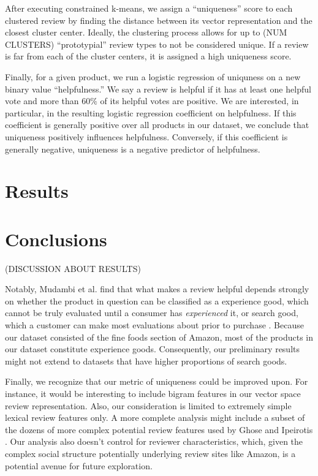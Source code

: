 \documentclass[10pt]{article}
\begin{document}
After executing constrained k-means, we assign a ``uniqueness'' score to each clustered review by finding the distance between its vector representation and the closest cluster center. Ideally, the clustering process allows for up to (NUM CLUSTERS) ``prototypial'' review types to not be considered unique. If a review is far from each of the cluster centers, it is assigned a high uniqueness score.

Finally, for a given product, we run a logistic regression of uniquness on a new binary value ``helpfulness.'' We say a review is helpful if it has at least one helpful vote and more than $60\%$ of its helpful votes are positive. We are interested, in particular, in the resulting logistic regression coefficient on helpfulness. If this coefficient is generally positive over all products in our dataset, we conclude that uniqueness positively influences helpfulness. Conversely, if this coefficient is generally negative, uniqueness is a negative predictor of helpfulness.
\section*{Results}



\section*{Conclusions}
(DISCUSSION ABOUT RESULTS)

Notably, Mudambi et al. find that what makes a review helpful depends strongly on whether the product in question can be classified as a experience good, which cannot be truly evaluated until a consumer has \emph{experienced} it, or search good, which a customer can make most evaluations about prior to purchase \cite{mudambi2010makes}. Because our dataset consisted of the fine foods section of Amazon, most of the products in our dataset constitute experience goods. Consequently, our preliminary results might not extend to datasets that have higher proportions of search goods.

Finally, we recognize that our metric of uniqueness could be improved upon. For instance, it would be interesting to include bigram features in our vector space review representation. Also, our consideration is limited to extremely simple lexical review features only. A more complete analysis might include a subset of the dozens of more complex potential review features used by Ghose and Ipeirotis \cite{ghose2011estimating}. Our analysis also doesn't control for reviewer characteristics, which, given the complex social structure potentially underlying review sites like Amazon, is a potential avenue for future exploration.


\end{document}
